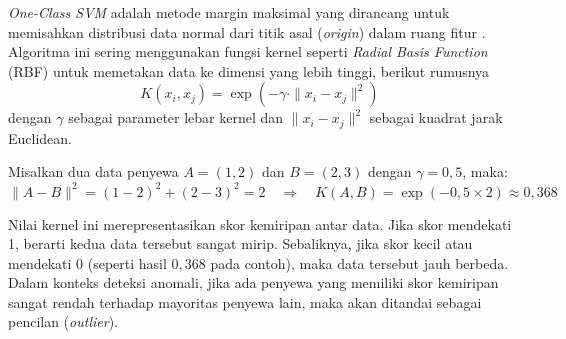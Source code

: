 \begin{enumerate}
        {\it One-Class SVM} adalah metode margin maksimal yang dirancang untuk memisahkan distribusi data normal dari titik asal ({\it origin}) dalam ruang fitur \cite{scholkopf2001estimating}. Algoritma ini sering menggunakan fungsi kernel seperti {\it Radial Basis Function} (RBF) untuk memetakan data ke dimensi yang lebih tinggi, berikut rumusnya
        \[
        K(x_i, x_j) = \exp\left(-\gamma \cdot \|x_i - x_j\|^2\right)
        \]
        dengan \(\gamma\) sebagai parameter lebar kernel dan \(\|x_i - x_j\|^2\) sebagai kuadrat jarak Euclidean.
        
        Misalkan dua data penyewa \(A = (1, 2)\) dan \(B = (2, 3)\) dengan \(\gamma = 0{,}5\), maka:
        \[
        \|A - B\|^2 = (1-2)^2 + (2-3)^2 = 2
        \quad \Rightarrow \quad
        K(A, B) = \exp(-0{,}5 \times 2) \approx 0{,}368
        \]
        
        Nilai kernel ini merepresentasikan skor kemiripan antar data. Jika skor mendekati 1, berarti kedua data tersebut sangat mirip. Sebaliknya, jika skor kecil atau mendekati 0 (seperti hasil \(0{,}368\) pada contoh), maka data tersebut jauh berbeda. Dalam konteks deteksi anomali, jika ada penyewa yang memiliki skor kemiripan sangat rendah terhadap mayoritas penyewa lain, maka akan ditandai sebagai pencilan ({\it outlier}).
        \end{enumerate}
